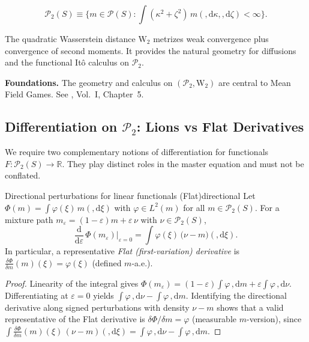 \documentclass[11pt,letterpaper,oneside]{article}
\numberwithin{equation}{section}
\newcommand{\R}{\mathbb{R}}
\newcommand{\1}{\mathbf{1}}
\newcommand{\diff}{,\mathrm{d}}
\begin{document}
$$
\mathcal P_2(S)\equiv\Big\{ m\in\mathcal P(S): \int (\kappa^2 + \zeta^2)\, m(\diff\kappa,\diff\zeta) < \infty\Big\}.
$$

The quadratic Wasserstein distance $\mathrm{W}_2$ metrizes weak convergence plus convergence of second moments. It provides the natural geometry for diffusions and the functional Itô calculus on $\mathcal P_2$.

\begin{tcolorbox}[literaturestyle]
\textbf{Foundations.} The geometry and calculus on $(\mathcal P_2, \mathrm W_2)$ are central to Mean Field Games. See \cite{carmona_delarue_2018_mfg}, Vol.~I, Chapter~5.
\end{tcolorbox}

\subsection{Differentiation on \texorpdfstring{$\mathcal P_2$}{P2}: Lions vs Flat Derivatives}

We require two complementary notions of differentiation for functionals $F:\mathcal P_2(S)\to\R$. They play distinct roles in the master equation and must not be conflated.

\begin{lemma}{Directional perturbations for linear functionals (Flat)}{directional}
Let $\Phi(m)=\int \varphi(\xi)\,m(\diff \xi)$ with $\varphi\in L^2(m)$ for all $m\in\mathcal P_2(S)$. For a mixture path $m_\varepsilon=(1-\varepsilon)m+\varepsilon\,\nu$ with $\nu\in\mathcal P_2(S)$,
\[
\frac{\mathrm d}{\mathrm d\varepsilon}\,\Phi(m_\varepsilon)\Big|_{\varepsilon=0}
= \int \varphi(\xi)\,\big(\nu-m\big)(\diff\xi).
\]
In particular, a representative \emph{Flat (first-variation) derivative} is $\tfrac{\delta \Phi}{\delta m}(m)(\xi)=\varphi(\xi)$ (defined $m$-a.e.).
\end{lemma}

\begin{proof}
Linearity of the integral gives $\Phi(m_\varepsilon)=(1-\varepsilon)\int\varphi\,\diff m+\varepsilon\int\varphi\,\diff\nu$. Differentiating at $\varepsilon=0$ yields $\int\varphi\,\diff\nu-\int\varphi\,\diff m$. Identifying the directional derivative along signed perturbations with density $\nu-m$ shows that a valid representative of the Flat derivative is $\delta\Phi/\delta m=\varphi$ (measurable $m$-version), since $\int \tfrac{\delta\Phi}{\delta m}(m)(\xi)\, (\nu-m)(\diff\xi)=\int\varphi\,\diff\nu-\int\varphi\,\diff m$.
\end{proof}
\end{document}
